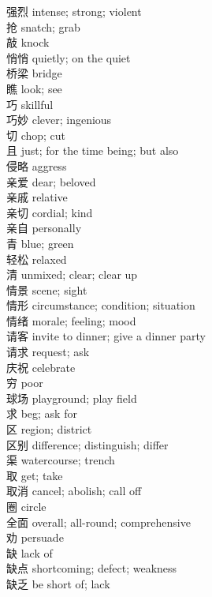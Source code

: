 强烈 \quad intense; strong; violent\\
抢 \quad snatch; grab\\
敲 \quad knock\\
悄悄 \quad quietly; on the quiet\\
桥梁 \quad bridge\\
瞧 \quad look; see\\
巧 \quad skillful\\
巧妙 \quad clever; ingenious\\
切 \quad chop; cut\\
且 \quad just; for the time being; but also\\
侵略 \quad aggress\\
亲爱 \quad dear; beloved\\
亲戚 \quad relative\\
亲切 \quad cordial; kind\\
亲自 \quad personally\\
青 \quad blue; green\\
轻松 \quad relaxed\\
清 \quad unmixed; clear; clear up\\
情景 \quad scene; sight\\
情形 \quad circumstance; condition; situation\\
情绪 \quad morale; feeling; mood\\
请客 \quad invite to dinner; give a dinner party\\
请求 \quad request; ask\\
庆祝 \quad celebrate\\
穷 \quad poor\\
球场 \quad playground; play field\\
求 \quad beg; ask for\\
区 \quad region; district\\
区别 \quad difference; distinguish; differ\\
渠 \quad watercourse; trench\\
取 \quad get; take\\
取消 \quad cancel; abolish; call off\\
圈 \quad circle\\
全面 \quad overall; all-round; comprehensive\\
劝 \quad persuade\\
缺 \quad lack of\\
缺点 \quad shortcoming; defect; weakness\\
缺乏 \quad be short of; lack\\
